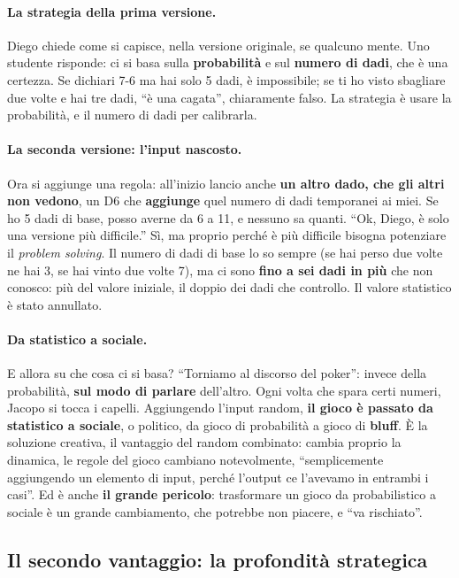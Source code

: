 \paragraph{La strategia della prima versione.} Diego chiede come si capisce, nella versione
originale, se qualcuno mente. Uno studente risponde: ci si basa sulla \textbf{probabilità} e
sul \textbf{numero di dadi}, che è una certezza. Se dichiari 7-6 ma hai solo 5 dadi, è
impossibile; se ti ho visto sbagliare due volte e hai tre dadi, ``è una cagata'', chiaramente
falso. La strategia è usare la probabilità, e il numero di dadi per calibrarla.

\paragraph{La seconda versione: l'input nascosto.} Ora si aggiunge una regola: all'inizio
lancio anche \textbf{un altro dado, che gli altri non vedono}, un D6 che \textbf{aggiunge}
quel numero di dadi temporanei ai miei. Se ho 5 dadi di base, posso averne da 6 a 11, e
nessuno sa quanti. ``Ok, Diego, è solo una versione più difficile.'' Sì, ma proprio perché è
più difficile bisogna potenziare il \emph{problem solving}. Il numero di dadi di base lo so
sempre (se hai perso due volte ne hai 3, se hai vinto due volte 7), ma ci sono \textbf{fino a
sei dadi in più} che non conosco: più del valore iniziale, il doppio dei dadi che controllo.
Il valore statistico è stato annullato.

\paragraph{Da statistico a sociale.} E allora su che cosa ci si basa? ``Torniamo al discorso
del poker'': invece della probabilità, \textbf{sul modo di parlare} dell'altro. Ogni volta che
spara certi numeri, Jacopo si tocca i capelli. Aggiungendo l'input random, \textbf{il gioco è
passato da statistico a sociale}, o politico, da gioco di probabilità a gioco di
\textbf{bluff}. È la soluzione creativa, il vantaggio del random combinato: cambia proprio la
dinamica, le regole del gioco cambiano notevolmente, ``semplicemente aggiungendo un elemento
di input, perché l'output ce l'avevamo in entrambi i casi''. Ed è anche \textbf{il grande
pericolo}: trasformare un gioco da probabilistico a sociale è un grande cambiamento, che
potrebbe non piacere, e ``va rischiato''.

\subsection{Il secondo vantaggio: la profondità strategica}

